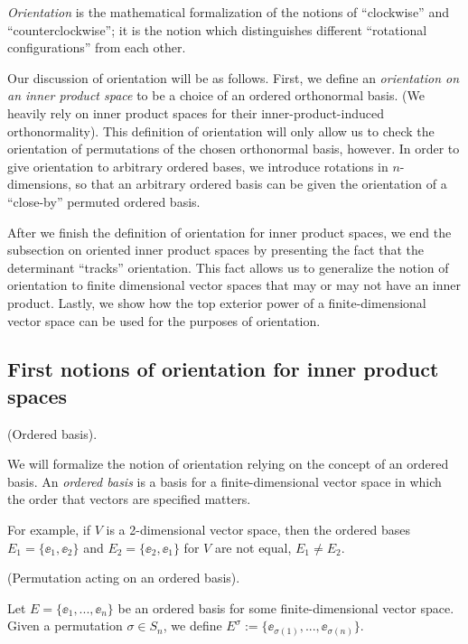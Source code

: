 \textit{Orientation} is the mathematical formalization of the notions of ``clockwise'' and ``counterclockwise''; it is the notion which distinguishes different ``rotational configurations'' from each other.

Our discussion of orientation will be as follows. First, we define an \textit{orientation on an inner product space} to be a choice of an ordered orthonormal basis. (We heavily rely on inner product spaces for their inner-product-induced orthonormality). This definition of orientation will only allow us to check the orientation of permutations of the chosen orthonormal basis, however. In order to give orientation to arbitrary ordered bases, we introduce rotations in $n$-dimensions, so that an arbitrary ordered basis can be given the orientation of a ``close-by'' permuted ordered basis.

After we finish the definition of orientation for inner product spaces, we end the subsection on oriented inner product spaces by presenting the fact that the determinant ``tracks'' orientation. This fact allows us to generalize the notion of orientation to finite dimensional vector spaces that may or may not have an inner product. Lastly, we show how the top exterior power of a finite-dimensional vector space can be used for the purposes of orientation.

\subsection*{First notions of orientation for inner product spaces}

\begin{defn}
    (Ordered basis).
    
    We will formalize the notion of orientation relying on the concept of an ordered basis. An \textit{ordered basis} is a basis for a finite-dimensional vector space in which the order that vectors are specified matters. 
    
    For example, if $V$ is a 2-dimensional vector space, then the ordered bases $E_1 = \{\ee_1, \ee_2\}$ and $E_2 = \{\ee_2, \ee_1\}$ for $V$ are not equal, $E_1 \neq E_2$.
\end{defn}

\begin{defn}
    (Permutation acting on an ordered basis). 
    
    Let $E = \{\ee_1, ..., \ee_n\}$ be an ordered basis for some finite-dimensional vector space. Given a permutation $\sigma \in S_n$, we define $E^\sigma := \{\ee_{\sigma(1)}, ..., \ee_{\sigma(n)}\}$.
\end{defn}

